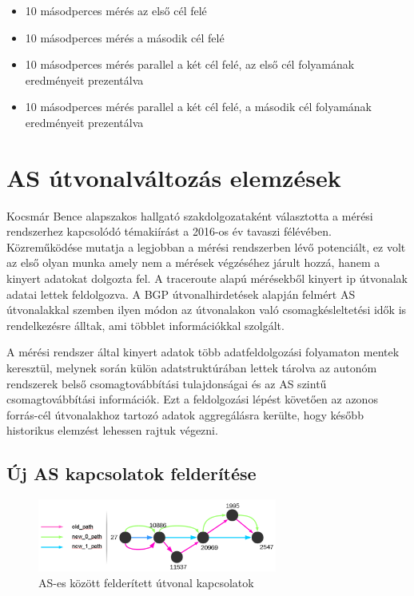\begin{itemize}
 \setlength{\parskip}{0pt}
 \setlength{\itemsep}{0pt plus 1pt}
 
\item 10 másodperces mérés az első cél felé
\item 10 másodperces mérés a második cél felé
\item 10 másodperces mérés parallel a két cél felé, az első cél folyamának eredményeit prezentálva
\item 10 másodperces mérés parallel a két cél felé, a második cél folyamának eredményeit prezentálva
\end{itemize}


\section{AS útvonalváltozás elemzések}


Kocsmár Bence alapszakos hallgató szakdolgozataként választotta a mérési rendszerhez kapcsolódó témakiírást a 2016-os év tavaszi félévében. Közreműködése mutatja a legjobban a mérési rendszerben lévő potenciált, ez volt az első olyan munka amely nem a mérések végzéséhez járult hozzá, hanem a kinyert adatokat dolgozta fel. A traceroute alapú mérésekből kinyert ip útvonalak adatai lettek feldolgozva. A BGP útvonalhirdetések alapján felmért AS útvonalakkal szemben ilyen módon az útvonalakon való csomagkésleltetési idők is rendelkezésre álltak, ami többlet információkkal szolgált.

A mérési rendszer által kinyert adatok több adatfeldolgozási folyamaton mentek keresztül, melynek során külön adatstruktúrában lettek tárolva az autonóm rendszerek belső csomagtovábbítási tulajdonságai és az AS szintű csomagtovábbítási információk. Ezt a feldolgozási lépést követően az azonos forrás-cél útvonalakhoz tartozó adatok aggregálásra kerülte, hogy később historikus elemzést lehessen rajtuk végezni.

\subsection{Új AS kapcsolatok felderítése}

\begin{figure}[!ht]
	\centering
	\includegraphics[width=0.70\textwidth, keepaspectratio]{figures/as-path-change-graph.PNG}
	\caption{AS-es között felderített útvonal kapcsolatok}
	\label{fig:as-path-change-graph}
\end{figure}

